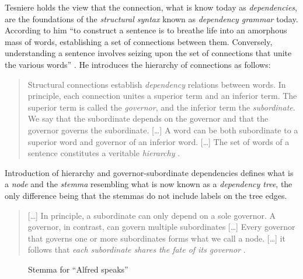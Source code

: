     Tesniere holds the view that the connection, what is know today as \textit{dependencies}, are the foundations of the \textit{structural syntax} known as \textit{dependency grammar} today. According to him ``to construct a sentence is to breathe life into an amorphous mass of words, establishing a set of connections between them. Conversely, understanding a sentence involves seizing upon the set of connections that unite the various words'' \citep[4]{Tesniere2015}. He introduces the hierarchy of connections as follows: 
    
    \begin{quotation}
        Structural connections establish \textit{dependency} relations between words. In principle, each connection unites a superior term and an inferior term. The superior term is called the \textit{governor}, and the inferior term the \textit{subordinate}. We say that the subordinate depends on the governor and that the governor governs the subordinate. [\dots] A word can be both subordinate to a superior word and governor of an inferior word. [\dots] The set of words of a sentence constitutes a veritable \textit{hierarchy} \citep[5--6]{Tesniere2015}.
    \end{quotation}

    Introduction of hierarchy and governor-subordinate dependencies defines what is a \textit{node} and the \textit{stemma} resembling what is now known as a \textit{dependency tree}, the only difference being that the stemmas do not include labels on the tree edges. 

    \begin{quotation}
        [\dots] In principle, a subordinate can only depend on a sole governor. A governor, in contrast, can govern multiple subordinates [\dots] Every governor that governs one or more subordinates forms what we call a node. [\dots] it follows that \textit{each subordinate shares the fate of its governor} \citep[6]{Tesniere2015}.
    \end{quotation}

    \begin{figure}[!ht]
        \centering
        \caption{Stemma for ``Alfred speaks''}
        \label{fig:stemma1}
    \end{figure}
    
